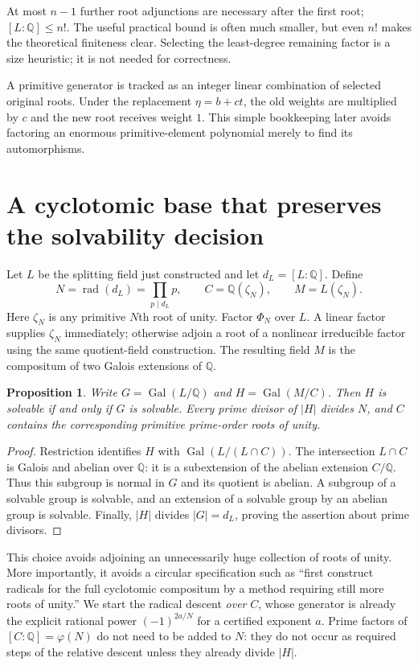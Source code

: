 \documentclass[11pt,letterpaper]{article}
\newtheorem{proposition}[theorem]{Proposition}
\theoremstyle{definition}\newtheorem{definition}[theorem]{Definition}
\theoremstyle{remark}\newtheorem{remark}[theorem]{Remark}
\newcommand{\Q}{\mathbb Q}\newcommand{\C}{\mathbb C}\newcommand{\Z}{\mathbb Z}
\newcommand{\Gal}{\operatorname{Gal}}\newcommand{\Aut}{\operatorname{Aut}}
\newcommand{\rad}{\operatorname{rad}}\newcommand{\Arg}{\operatorname{Arg}}
\begin{document}
At most $n-1$ further root adjunctions are necessary after the first root; $[L:\Q]\leq n!$. The useful practical bound is often much smaller, but even $n!$ makes the theoretical finiteness clear. Selecting the least-degree remaining factor is a size heuristic; it is not needed for correctness.

A primitive generator is tracked as an integer linear combination of selected original roots. Under the replacement $\eta=b+ct$, the old weights are multiplied by $c$ and the new root receives weight $1$. This simple bookkeeping later avoids factoring an enormous primitive-element polynomial merely to find its automorphisms.

\section{A cyclotomic base that preserves the solvability decision}\label{sec:cyclobase}
Let $L$ be the splitting field just constructed and let $d_L=[L:\Q]$. Define
\[
 N=\rad(d_L)=\prod_{p\mid d_L}p,\qquad
 C=\Q(\zeta_N),\qquad M=L(\zeta_N).
\]
Here $\zeta_N$ is any primitive $N$th root of unity. Factor $\Phi_N$ over $L$. A linear factor supplies $\zeta_N$ immediately; otherwise adjoin a root of a nonlinear irreducible factor using the same quotient-field construction. The resulting field $M$ is the compositum of two Galois extensions of $\Q$.

\begin{proposition}\label{prop:cyclo}
Write $G=\Gal(L/\Q)$ and $H=\Gal(M/C)$. Then $H$ is solvable if and only if $G$ is solvable. Every prime divisor of $|H|$ divides $N$, and $C$ contains the corresponding primitive prime-order roots of unity.
\end{proposition}
\begin{proof}
Restriction identifies $H$ with $\Gal(L/(L\cap C))$. The intersection $L\cap C$ is Galois and abelian over $\Q$: it is a subextension of the abelian extension $C/\Q$. Thus this subgroup is normal in $G$ and its quotient is abelian. A subgroup of a solvable group is solvable, and an extension of a solvable group by an abelian group is solvable. Finally, $|H|$ divides $|G|=d_L$, proving the assertion about prime divisors.
\end{proof}

This choice avoids adjoining an unnecessarily huge collection of roots of unity. More importantly, it avoids a circular specification such as ``first construct radicals for the full cyclotomic compositum by a method requiring still more roots of unity.'' We start the radical descent \emph{over} $C$, whose generator is already the explicit rational power $(-1)^{2a/N}$ for a certified exponent $a$. Prime factors of $[C:\Q]=\varphi(N)$ do not need to be added to $N$: they do not occur as required steps of the relative descent unless they already divide $|H|$.
\end{document}
